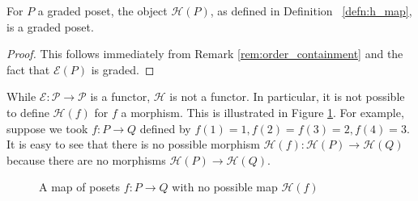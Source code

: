 \documentclass[smallextended, envcountsame, numbook]{svjour3}
\numberwithin{equation}{section}
\begin{document}
\begin{lemma}\label{lem:HP_order}
For $P$ a graded poset, the object $\mathcal{H}(P)$, as defined in Definition ~\ref{defn:h_map}, is a graded poset.
\end{lemma}

\begin{proof}
This follows immediately from Remark \ref{rem:order_containment} and the fact that $\mathcal E(P)$ is graded.
\end{proof}

\begin{remark}
While $\mathcal E\colon\mathcal P \rightarrow \mathcal P$ is a functor, $\mathcal H$ is not a functor. In particular, it is not possible to define $\mathcal H(f)$ for $f$ a morphism. This is illustrated in Figure \ref{fig:h_morphism}. For example, suppose we took $f\colon P \rightarrow Q$ defined by $f(1) = 1, f(2) = f(3) = 2,f(4) = 3$. 
It is easy to see that there is no possible morphism $\mathcal H(f)\colon\mathcal H(P)\rightarrow \mathcal H(Q)$ because there are no morphisms $\mathcal H(P) \rightarrow \mathcal H(Q)$.

\begin{figure}[h!]
\begin{center}
\quad
{}\quad
{} \quad
{}
\end{center}
\caption{\label{fig:h_morphism} A map of posets $f:P \rightarrow Q$ with no possible map $\mathcal H(f)$}
\end{figure}
\end{remark}
\end{document}
